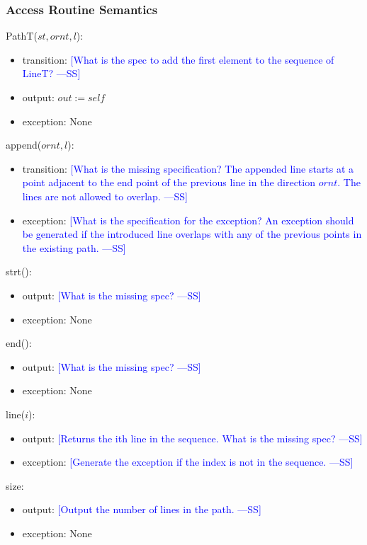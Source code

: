 \documentclass[12pt]{article}
\newcommand{\authornote}[3]{\textcolor{#1}{[#3 ---#2]}}
\newcommand{\authornote}[3]{}
\newcommand{\wss}[1]{\authornote{blue}{SS}{#1}}
\begin{document}
\subsubsection* {Access Routine Semantics}

PathT($st, ornt, l$):
\begin{itemize}
\item transition: \wss{What is the spec to add the first element to the sequence
  of LineT?}
\item output: $out := \mathit{self}$
\item exception: None
\end{itemize}

\noindent append($ornt, l$):
\begin{itemize}
\item transition: \wss{What is the missing specification?  The appended line
    starts at a point adjacent to the end point of the previous line in the
    direction $ornt$.  The lines are not allowed to
    overlap.}
\item exception: \wss{What is the specification for the exception?  An exception
    should be generated if the introduced line overlaps with any of the previous
    points in the existing path.}
\end{itemize}

\noindent strt():
\begin{itemize}
\item output: \wss{What is the missing spec?}
\item exception: None
\end{itemize}

\noindent end():
\begin{itemize}
\item output: \wss{What is the missing spec?}
\item exception: None
\end{itemize}

\noindent line($i$):
\begin{itemize}
\item output: \wss{Returns the ith line in the sequence.  What is the missing spec?}
\item exception: \wss{Generate the exception if the index is not in the sequence.}
\end{itemize}

\noindent size:
\begin{itemize}
\item output: \wss{Output the number of lines in the path.}
\item exception: None
\end{itemize}
\end{document}

